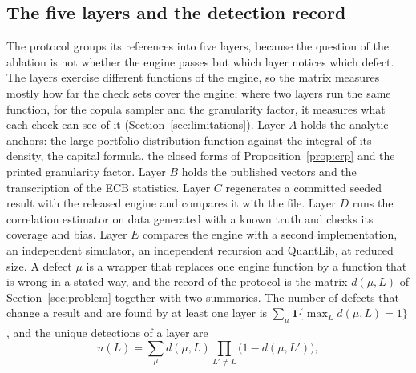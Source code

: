 \subsection{The five layers and the detection record}

The protocol groups its references into five layers, because the question of the ablation is not whether the engine passes but which layer notices which defect. The layers exercise different functions of the engine, so the matrix measures mostly how far the check sets cover the engine; where two layers run the same function, for the copula sampler and the granularity factor, it measures what each check can see of it (Section~\ref{sec:limitations}). Layer $A$ holds the analytic anchors: the large-portfolio distribution function against the integral of its density, the capital formula, the closed forms of Proposition~\ref{prop:crp} and the printed granularity factor. Layer $B$ holds the published vectors and the transcription of the ECB statistics. Layer $C$ regenerates a committed seeded result with the released engine and compares it with the file. Layer $D$ runs the correlation estimator on data generated with a known truth and checks its coverage and bias. Layer $E$ compares the engine with a second implementation, an independent simulator, an independent recursion and QuantLib, at reduced size. A defect $\mu$ is a wrapper that replaces one engine function by a function that is wrong in a stated way, and the record of the protocol is the matrix $d(\mu,L)$ of Section~\ref{sec:problem} together with two summaries. The number of defects that change a result and are found by at least one layer is $\sum_{\mu}\mathbf 1\{\max_Ld(\mu,L)=1\}$, and the unique detections of a layer are
\begin{equation}
  u(L)=\sum_{\mu}d(\mu,L)\prod_{L'\ne L}\bigl(1-d(\mu,L')\bigr),
  \label{eq:unique}
\end{equation}
